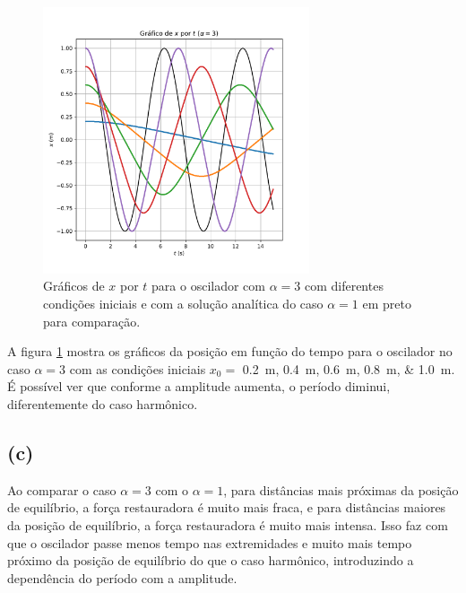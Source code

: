 \documentclass[a4paper, brazil]{article}
\begin{document}
\begin{figure}[ht]
\centering
\includegraphics[width=0.7\textwidth]{fig3b.pdf}
\caption{Gráficos de \( x \) por \( t \) para o oscilador com \( \alpha = 3 \) com diferentes condições iniciais e com a solução analítica do caso \( \alpha = 1 \) em preto para comparação.}
\label{fig3b}
\end{figure}

A figura \ref{fig3b} mostra os gráficos da posição em função do tempo para o oscilador no caso \( \alpha = 3 \) com as condições iniciais \( x_0 = \) \SIlist{0.2;0.4;0.6;0.8;1.0}{\metre}.
É possível ver que conforme a amplitude aumenta, o período diminui, diferentemente do caso harmônico.

\subsection{(c)}

Ao comparar o caso \( \alpha = 3 \) com o \( \alpha = 1 \), para distâncias mais próximas da posição de equilíbrio, a força restauradora é muito mais fraca, e para distâncias maiores da posição de equilíbrio, a força restauradora é muito mais intensa.
Isso faz com que o oscilador passe menos tempo nas extremidades e muito mais tempo próximo da posição de equilíbrio do que o caso harmônico, introduzindo a dependência do período com a amplitude.
\end{document}
